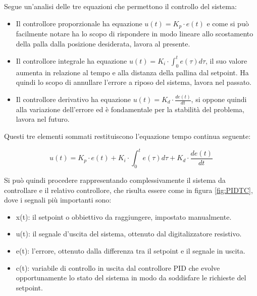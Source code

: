 \documentclass[12pt,twoside,openright]{article}
\begin{document}
Segue un'analisi delle tre equazioni che permettono il controllo del sistema:

\begin{itemize}
\item Il controllore proporzionale ha equazione $u(t)=K_p \cdot e(t)$ e come si può facilmente notare ha lo scopo di rispondere in modo lineare allo scostamento della palla dalla posizione desiderata, lavora al presente.
\item Il controllore integrale ha equazione $u(t)=K_i \cdot \int_0^t e(\tau)d\tau$, il suo valore aumenta in relazione al tempo e alla distanza della pallina dal setpoint. Ha quindi lo scopo di annullare l'errore a riposo del sistema, lavora nel passato.
\item Il controllore derivativo ha equazione $u(t)=K_d\cdot \frac{de(t)}{dt}$, si oppone quindi alla variazione dell'errore ed è fondamentale per la stabilità del problema, lavora nel futuro.
\end{itemize}
Questi tre elementi sommati restituiscono l'equazione tempo continua seguente:

\begin{equation}\label{pidtc}
    u(t)=K_p \cdot e(t) + K_i \cdot \int_0^t e(\tau)d\tau + K_d\cdot \frac{de(t)}{dt}
\end{equation}

Si può quindi procedere rappresentando complessivamente il sistema da controllare
e il relativo controllore, che risulta essere come in figura \ref{fig:PIDTC}, dove i segnali più importanti sono:
\begin{itemize}
\item x(t): il setpoint o obbiettivo da raggiungere, impostato manualmente.
\item u(t): il segnale d'uscita del sistema, ottenuto dal digitalizzatore resistivo.
\item e(t): l'errore, ottenuto dalla differenza tra il setpoint e il segnale in uscita.
\item c(t): variabile di controllo in uscita dal controllore PID che evolve opportunamente lo stato del sistema in modo da soddisfare le richieste del setpoint.

\end{itemize}
\end{document}
